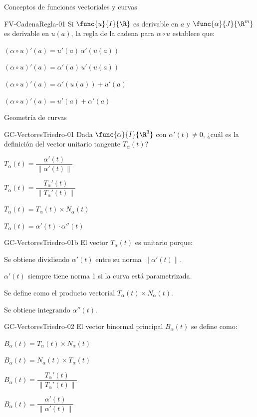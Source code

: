 \documentclass[a4,11pt]{aleph-notas}
\begin{document}
\begin{quiz}{Conceptos de funciones vectoriales y curvas}
\begin{multi}[]%
    {FV-CadenaRegla-01}
    Si $\func{u}{I}{\R}$ es derivable en $a$ y $\func{\alpha}{J}{\R^m}$ es derivable en $u(a)$, la regla de la cadena para $\alpha\circ u$ establece que:
    \item* $(\alpha\circ u)'(a)=u'(a)\,\alpha'(u(a))$
    \item $(\alpha\circ u)'(a)=\alpha'(a)\,u'(u(a))$
    \item $(\alpha\circ u)'(a)=\alpha'(u(a))+u'(a)$
    \item $(\alpha\circ u)'(a)=u'(a)+\alpha'(a)$
\end{multi}


\end{quiz}


\begin{quiz}{Geometría de curvas}

\begin{multi}[]%
    {GC-VectoresTriedro-01}
    Dada $\func{\alpha}{I}{\R^3}$ con $\alpha'(t)\neq 0$, ¿cuál es la definición del vector unitario tangente $T_\alpha(t)$?
    \item* $T_\alpha(t)=\dfrac{\alpha'(t)}{\|\alpha'(t)\|}$
    \item $T_\alpha(t)=\dfrac{T_\alpha'(t)}{\|T_\alpha'(t)\|}$
    \item $T_\alpha(t)=T_\alpha(t)\times N_\alpha(t)$
    \item $T_\alpha(t)=\alpha'(t)\cdot\alpha''(t)$
\end{multi}

\begin{multi}[]%
    {GC-VectoresTriedro-01b}
    El vector $T_\alpha(t)$ es unitario porque:
    \item* Se obtiene dividiendo $\alpha'(t)$ entre su norma $\|\alpha'(t)\|$.
    \item $\alpha'(t)$ siempre tiene norma 1 si la curva está parametrizada.
    \item Se define como el producto vectorial $T_\alpha(t)\times N_\alpha(t)$.
    \item Se obtiene integrando $\alpha''(t)$.
\end{multi}

\begin{multi}[]%
    {GC-VectoresTriedro-02}
    El vector binormal principal $B_\alpha(t)$ se define como:
    \item* $B_\alpha(t)=T_\alpha(t)\times N_\alpha(t)$
    \item $B_\alpha(t)=N_\alpha(t)\times T_\alpha(t)$
    \item $B_\alpha(t)=\dfrac{T_\alpha'(t)}{\|T_\alpha'(t)\|}$
    \item $B_\alpha(t)=\dfrac{\alpha'(t)}{\|\alpha'(t)\|}$
\end{multi}


\end{quiz}
\end{document}
